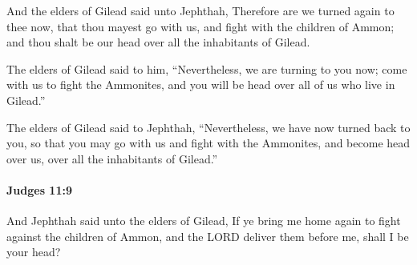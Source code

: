 			\begin{versebox}
					\item[BHS] 
					\item[ASV] And the elders of Gilead said unto Jephthah, Therefore are we turned again to thee now, that thou mayest go with us, and fight with the children of Ammon; and thou shalt be our head over all the inhabitants of Gilead.
					\item[NIV] The elders of Gilead said to him, “Nevertheless, we are turning to you now; come with us to fight the Ammonites, and you will be head over all of us who live in Gilead.”
					\item[NRSV] The elders of Gilead said to Jephthah, “Nevertheless, we have now turned back to you, so that you may go with us and fight with the Ammonites, and become head over us, over all the inhabitants of Gilead.”
			\end{versebox}

		\paragraph{Judges 11:9} %
			\label{JUDGES-11-9}

			And Jephthah said unto the elders of Gilead, If ye bring me home again to fight against the children of Ammon, and the LORD deliver them before me, shall I be your head?

